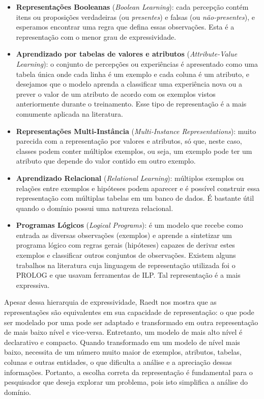 \begin{itemize}
    \item \textbf{Representações Booleanas} (\textit{Boolean Learning}): cada percepção contém itens ou proposições verdadeiras (ou \textit{presentes}) e falsas (ou \textit{não-presentes}), e esperamos encontrar uma regra que defina essas observações. Esta é a representação com o menor grau de expressividade.
    \item \textbf{Aprendizado por tabelas de valores e atributos} (\textit{Attribute-Value Learning}): o conjunto de percepções ou experiências é apresentado como uma tabela única onde cada linha é um exemplo e cada coluna é um atributo, e desejamos que o modelo aprenda a classificar uma experiência nova ou a prever o valor de um atributo de acordo com os exemplos vistos anteriormente durante o treinamento. Esse tipo de representação é a mais comumente aplicada na literatura.
    \item \textbf{Representações Multi-Instância} (\textit{Multi-Instance Representations}): muito parecida com a representação por valores e atributos, só que, neste caso, classes podem conter múltiplos exemplos, ou seja, um exemplo pode ter um atributo que depende do valor contido em outro exemplo.
    \item \textbf{Aprendizado Relacional} (\textit{Relational Learning}): múltiplos exemplos ou relações entre exemplos e hipóteses podem aparecer e é possível construir essa representação com múltiplas tabelas em um banco de dados. É bastante útil quando o domínio possui uma natureza relacional.
    \item \textbf{Programas Lógicos} (\textit{Logical Programs}): é um modelo que recebe como entrada as diversas observações (exemplos) e aprende a sintetizar um programa lógico com regras gerais (hipóteses) capazes de derivar estes exemplos e classificar outros conjuntos de observações. Existem alguns trabalhos na literatura cuja linguagem de representação utilizada foi o PROLOG e que usavam ferramentas de ILP. Tal representação é a mais expressiva.
\end{itemize}

Apesar dessa hierarquia de expressividade, Raedt nos mostra que as representações são equivalentes em sua capacidade de representação: o que pode ser modelado por uma pode ser adaptado e transformado em outra representação de mais baixo nível e vice-versa. Entretanto, um modelo de mais alto nível é declarativo e compacto. Quando transformado em um modelo de nível mais baixo, necessita de um número muito maior de exemplos, atributos, tabelas, colunas e outras entidades, o que dificulta a análise e a apreciação dessas informações. Portanto, a escolha correta da representação é fundamental para o pesquisador que deseja explorar um problema, pois isto simplifica a análise do domínio.

